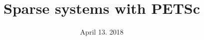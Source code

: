 

\newcommand{\xR}{\mathbb{R}}
\newcommand{\xRd}{{\xR^d}}
\newcommand{\xRN}{{\xR^N}}
\newcommand{\xMNR}{{M_N(\xR)}}
\newcommand{\bb}{{\boldsymbol b}}
\newcommand{\ee}{{\boldsymbol e}}
\newcommand{\ev}{{\boldsymbol \epsilon}}
\newcommand{\rr}{{\boldsymbol r}}
\newcommand{\xx}{{\boldsymbol x}}
\newcommand{\hx}{\hat{\boldsymbol x}}
\newcommand{\yy}{{\boldsymbol y}}
\newcommand{\vv}{{\boldsymbol v}}
\newcommand{\ww}{{\boldsymbol w}}
\newcommand{\zz}{{\boldsymbol z}}
\renewcommand{\mA}{{\mathrm A}}
\newcommand{\mB}{{\mathrm B}}
\newcommand{\mC}{{\mathrm C}}
\newcommand{\mD}{{\mathrm D}}
\newcommand{\mG}{{\mathrm G}}
\newcommand{\mH}{{\mathrm H}}
\renewcommand{\mL}{{\mathrm L}}
\newcommand{\mLs}{{\mathrm L_0}}
\newcommand{\mM}{{\mathrm M}}
\newcommand{\mRs}{{\mathrm R_0}}
\newcommand{\mR}{{\mathrm R}}
\newcommand{\mP}{{\mathrm P}}
\newcommand{\mQ}{{\mathrm Q}}
\newcommand{\mU}{{\mathrm U}}
\newcommand{\mId}{{\mathbf{Id}}}
\newcommand{\mII}{{\mathbf{\mathbb{I}}}}
\newcommand{\Seq}[1]{\bigl(#1\bigr)}
\newcommand{\Cond}[1]{\mathcal{C}(#1)}
\newcommand{\Order}[1]{\mathcal{O}\left(#1\right)}
\newcommand{\norm}[1]{{\lVert #1 \rVert}}
\newcommand{\norminf}[1]{\norm{#1}_{\infty}}

\newcommand{\InnerK}[2]{{{\mathbf\langle}\;#1\:,\: #2 \;{\rangle}}}
\newcommand{\Inner}[2]{{{\scriptstyle\mathbf{(}}\;#1\:,\: #2 \;{\scriptstyle\mathbf{)}}}}


\title{Sparse systems with PETSc}
\date{April 13. 2018}

\maketitle

